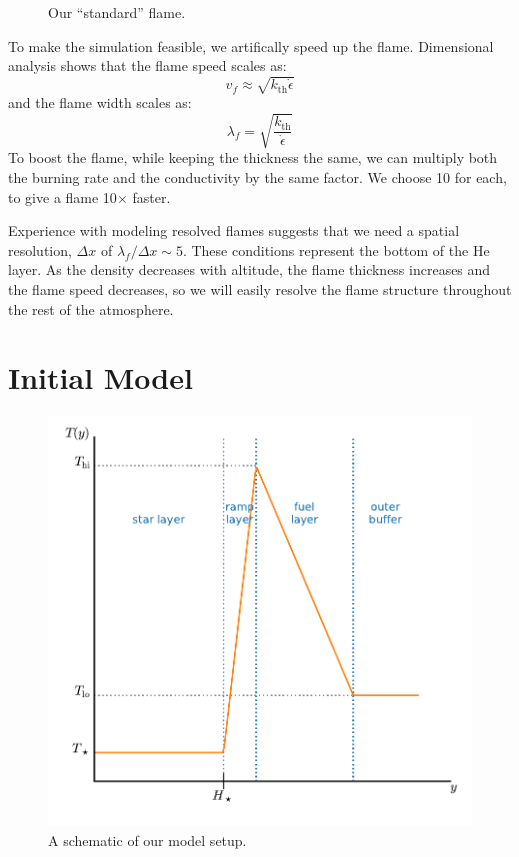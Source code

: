 \documentclass[twocolumn,times,tighten]{aastex62}
\newcommand{\MarginPar}[1]{\marginpar{\vskip-\baselineskip\raggedright\tiny\sffamily\hrule\smallskip{\color{red}#1}\par\smallskip\hrule}}
\begin{document}
\begin{figure}[t]
\caption{\label{fig:flame} Our ``standard'' flame.}
\end{figure}

To make the simulation feasible, we artifically speed up the flame.
Dimensional analysis shows that the flame speed scales as:\MarginPar{ref}
\begin{equation}
v_f \approx \sqrt{k_\mathrm{th} \dot{\epsilon}}
\end{equation}
and the flame width scales as:
\begin{equation}
\lambda_f = \sqrt{\frac{k_\mathrm{th}}{\dot{\epsilon}}}
\end{equation}
To boost the flame, while keeping the thickness the same, we can
multiply both the burning rate and the conductivity by the same
factor.  We choose 10 for each, to give a flame 10$\times$ faster.

Experience with modeling resolved flames suggests that we need a
spatial resolution, $\Delta x$ of $\lambda_f/\Delta x \sim 5$.  These
conditions represent the bottom of the He layer.  As the density
decreases with altitude, the flame thickness increases and the flame
speed decreases, so we will easily resolve the flame structure throughout
the rest of the atmosphere.


\section{Initial Model}\label{Sec:inital_model}

\begin{figure}[t]
\centering
\includegraphics[width=\linewidth]{model}
\caption{\label{fig:sketch} A schematic of our model setup.}
\end{figure}
\end{document}
